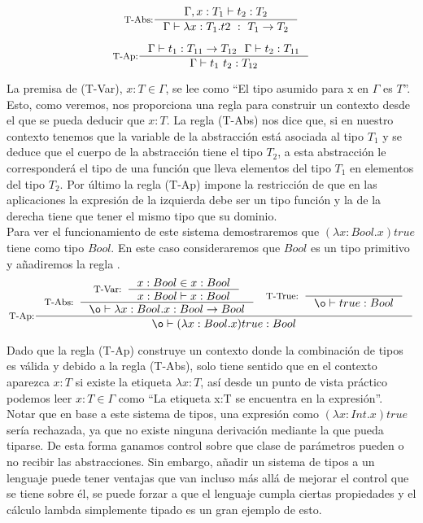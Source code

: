 \[\inference[T-Abs:]
  {\Gamma,x:T_1 |- t_2:T_2}
  {\Gamma |- \lambda x:T_1.t2\ :\ T_1 -> T_2}
\]

\[\inference[T-Ap:]
  {\Gamma |- t_1:T_{11}->T_{12}\ \ \Gamma |- t_2:T_{11}}
  {\Gamma |- t_1\ t_2:T_{12}}
\]

La premisa de (T-Var), $x:T \in \Gamma$, se lee como ``El tipo asumido para x en $\Gamma$ es $T$''. Esto, como veremos, nos proporciona una regla para construir un contexto desde el que se pueda deducir que $x:T$. La regla (T-Abs) nos dice que, si en nuestro contexto tenemos que la variable de la abstracción está asociada al tipo $T_1$ y se deduce que el cuerpo de la abstracción tiene el tipo $T_2$, a esta abstracción le corresponderá el tipo de una función que lleva elementos del tipo $T_1$ en elementos del tipo $T_2$. Por último la regla (T-Ap) impone la restricción de que en las aplicaciones la expresión de la izquierda debe ser un tipo función y la de la derecha tiene que tener el mismo tipo que su dominio.\\

Para ver el funcionamiento de este sistema demostraremos que $(\lambda x:Bool.x)true$ tiene como tipo $Bool$. En este caso consideraremos que $Bool$ es un tipo primitivo y añadiremos la regla .\\

\[\inference[T-Ap:]
  {\inference[T-Abs:]
    {\inference[T-Var:]
      {x:Bool \in x:Bool}
      {x:Bool |- x:Bool}}
    {\o |- \lambda x:Bool.x : Bool -> Bool}
   \quad
   \inference[T-True:]{}
    {\o |- true:Bool}}
  {\o |- (\lambda x:Bool.x)true : Bool}
\]

\bigskip

Dado que la regla (T-Ap) construye un contexto donde la combinación de tipos es válida y debido a la regla (T-Abs), solo tiene sentido que en el contexto aparezca $x:T$ si existe la etiqueta $\lambda x:T$, así desde un punto de vista práctico podemos leer $x:T \in \Gamma$ como ``La etiqueta x:T se encuentra en la expresión''.\\

Notar que en base a este sistema de tipos, una expresión como $(\lambda x:Int.x)true$ sería rechazada, ya que
no existe ninguna derivación mediante la que pueda tiparse. De esta forma ganamos control sobre que clase de
parámetros pueden o no recibir las abstracciones. Sin embargo, añadir un sistema de tipos a un lenguaje
puede tener ventajas que van incluso más allá de mejorar el control que se tiene sobre él, se puede forzar
a que el lenguaje cumpla ciertas propiedades y el cálculo lambda simplemente tipado es un gran ejemplo de esto.\\

